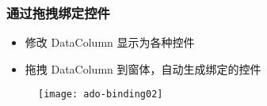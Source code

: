\begin{frame}
\frametitle{通过拖拽绑定控件}
\begin{itemize}
\item 修改 DataColumn 显示为各种控件
\item 拖拽 DataColumn 到窗体，自动生成绑定的控件
\end{itemize}
\begin{figure}
  \centering
  \texttt{[image: ado-binding02]}
\end{figure}
\end{frame}



